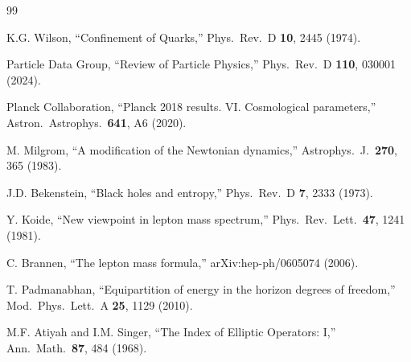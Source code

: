 \documentclass[11pt,a4paper]{article}
\theoremstyle{plain}
\theoremstyle{definition}
\theoremstyle{remark}
\begin{document}
\begin{thebibliography}{99}

 K.G. Wilson, ``Confinement of Quarks,'' Phys.\ Rev.\ D \textbf{10}, 2445 (1974).

 Particle Data Group, ``Review of Particle Physics,'' Phys.\ Rev.\ D \textbf{110}, 030001 (2024).

 Planck Collaboration, ``Planck 2018 results. VI. Cosmological parameters,'' Astron.\ Astrophys.\ \textbf{641}, A6 (2020).

 M. Milgrom, ``A modification of the Newtonian dynamics,'' Astrophys.\ J.\ \textbf{270}, 365 (1983).

 J.D. Bekenstein, ``Black holes and entropy,'' Phys.\ Rev.\ D \textbf{7}, 2333 (1973).

 Y. Koide, ``New viewpoint in lepton mass spectrum,'' Phys.\ Rev.\ Lett.\ \textbf{47}, 1241 (1981).

 C. Brannen, ``The lepton mass formula,'' arXiv:hep-ph/0605074 (2006).

 T. Padmanabhan, ``Equipartition of energy in the horizon degrees of freedom,'' Mod.\ Phys.\ Lett.\ A \textbf{25}, 1129 (2010).

 M.F. Atiyah and I.M. Singer, ``The Index of Elliptic Operators: I,'' Ann.\ Math.\ \textbf{87}, 484 (1968).

\end{thebibliography}
\end{document}
